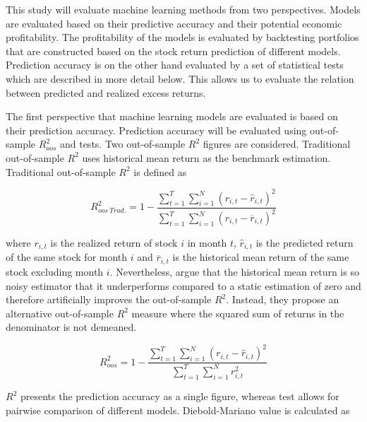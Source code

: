 \documentclass[12pt]{article}
\begin{document}
This study will evaluate machine learning methods from two perspectives. Models are evaluated based on their predictive accuracy and their potential economic profitability. The profitability of the models is evaluated by backtesting portfolios that are constructed based on the stock return prediction of different models. Prediction accuracy is on the other hand evaluated by a set of statistical tests which are described in more detail below. This allows us to evaluate the relation between predicted and realized excess returns. \par

The first perspective that machine learning models are evaluated is based on their prediction accuracy. Prediction accuracy will be evaluated using out-of-sample $R^{2}_{oos}$ and \citet{Diebold1995} tests. Two out-of-sample $R^{2}$ figures are considered. Traditional out-of-sample $R^{2}$ uses historical mean return as the benchmark estimation. Traditional out-of-sample $R^{2}$ is defined as \par

\begin{equation}
\label{eq:r2Trad}
R^{2}_{oos \ Trad.} = 1 - \frac{\sum^T_{t=1} \sum^N_{i=1} (r_{i, t} - \hat r_{i, t})^2}{ \sum^T_{t=1} \sum^N_{i=1} (r_{i, t} - \overline{r}_{i, t} )^2}
\end{equation}

where $r_{i, t}$ is the realized return of stock $i$ in month $t$, $\hat r_{i, t}$ is the predicted return of the same stock for month $i$ and $\overline{r}_{i, t}$ is the historical mean return of the same stock excluding month $i$. Nevertheless, \citet{guetal} argue that the historical mean return is so noisy estimator that it underperforms compared to a static estimation of zero and therefore artificially improves the out-of-sample $R^{2}$. Instead, they propose an alternative out-of-sample $R^{2}$ measure where the squared sum of returns in the denominator is not demeaned. \par

\begin{equation}
\label{eq:r2}
R^{2}_{oos} = 1 - \frac{\sum^T_{t=1} \sum^N_{i=1} (r_{i, t} - \hat r_{i, t})^2}{ \sum^T_{t=1} \sum^N_{i=1} r^2_{i, t}}
\end{equation}

$R^2$ presents the prediction accuracy as a single figure, whereas \citet{Diebold1995} test allows for pairwise comparison of different models. Diebold-Mariano value is calculated as \par
\end{document}
